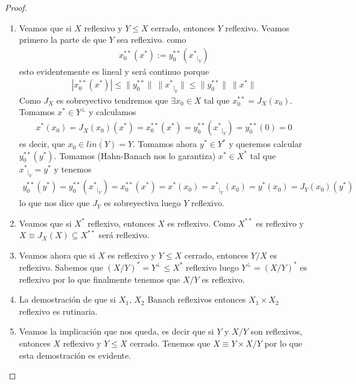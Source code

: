 \begin{prop}
\begin{proof}
\begin{enumerate}
            \item Veamos que si $X$ reflexivo y $Y\leq X$ cerrado, entonces $Y$ reflexivo. Veamos primero la parte de que $Y$ sea reflexivo. como 
            \begin{gather*}
                x_0^{**}(x^*) := y_0^{**}({x^*}_{|_Y})
            \end{gather*}
            esto evidentemente es lineal y será continuo porque 
            \begin{gather*}
                |x_0^{**}(x^*)| \leq \| y_0^{**}\| \  \|{x^*}_{|_Y} \| \leq  \| y_0^{**}\| \ \|{x^*}\|
            \end{gather*}
            Como $J_X$ es sobreyectivo tendremos que $\exists x_0\in X$ tal que $x_0^{**}=J_X(x_0)$. Tomamos $x^*\in Y^{\perp}$ y calculamos 
            \begin{gather*}
                x^*(x_0)=J_X(x_0)(x^*) = x_0^{**}(x^*)=y_0^{**}({x^*}_{|_Y}) = y_0^{**}(0)=0
            \end{gather*}
            es decir, que $x_0 \in \overline{lin(Y)} = Y$. Tomamos ahora $y^*\in Y^*$ y queremos calcular $y_0^{**}(y^*)$. Tomamos (Hahn-Banach nos lo garantiza) $x^*\in X^*$ tal que ${x^*}_{|_Y}=y^*$ y tenemos
            \begin{gather*}
                y_0^{**}(y^*) = y_0^{**}({x^*}_{|_Y}) = x_0^{**}(x^*) = x^*(x_0) = {x^*}_{|_Y}(x_0) = y^*(x_0) = J_Y(x_0)(y^*)
            \end{gather*}
            lo que nos dice que $J_Y$ es sobreyectiva luego $Y$ reflexivo.

            \item Veamos que si $X^*$ reflexivo, entonces $X$ es reflexivo. Como $X^{**}$ es reflexivo y $X\equiv J_X(X)\subseteq X^{**}$ será reflexivo.
            
            \item Veamos ahora que si $X$ es reflexivo y $Y\leq X$ cerrado, entonces $Y/X$ es reflexivo. Sabemos que $(X/Y)^*=Y^{\perp}\leq X^*$ reflexivo luego $Y^{\perp} = (X/Y)^*$ es reflexivo por lo que finalmente tenemos que $X/Y$ es reflexivo.
            
            \item La demostración de que si $X_1$, $X_2$ Banach reflexivos entonces $X_1\times X_2$ reflexivo es rutinaria. 
            
            \item Veamos la implicación que nos queda, es decir que si $Y$ y $X/Y$ son reflexivos, entonces $X$ reflexivo y $Y\leq X$ cerrado. Tenemos que $X\equiv Y \times X/Y$ por lo que esta demostración es evidente. 
        \end{enumerate}
    \end{proof}
\end{prop}

